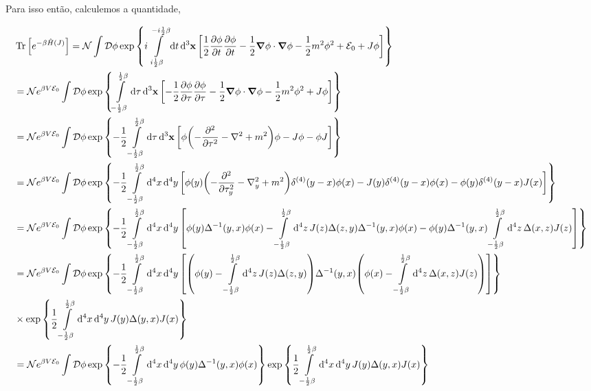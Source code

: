 \documentclass[twoside]{amsart}
\newcommand{\Dd}[1]{\mathcal D #1}
\numberwithin{equation}{section}
\begin{document}
Para isso então, calculemos a quantidade,

\begin{align}
    &\Tr\qty[e^{-\beta\hat H\qty(J)}]=\mathcal N\int\Dd{\phi} \exp\qty{i\int\limits_{i\frac12\beta}^{-i\frac12\beta}\dd{t}\dd[3]{\vb x}\qty[\frac12\pdv{\phi}{t}\pdv{\phi}{t}-\frac12\grad\phi\cdot\grad\phi-\frac12m^2\phi^2+\mathcal E_0+J\phi]}\\
    &=\mathcal Ne^{\beta V\mathcal E_0}\int\Dd{\phi}\exp\qty{\int\limits_{-\frac12\beta}^{\frac12\beta}\dd{\tau}\dd[3]{\vb x}\qty[-\frac12\pdv{\phi}{\tau}\pdv{\phi}{\tau}-\frac12\grad\phi\cdot\grad\phi-\frac12m^2\phi^2+J\phi]}\\
    &=\mathcal Ne^{\beta V\mathcal E_0}\int\Dd{\phi}\exp\qty{-\frac12\int\limits_{-\frac12\beta}^{\frac12\beta}\dd{\tau}\dd[3]{\vb x}\qty[\phi\qty(-\pdv[2]{}{\tau}-\laplacian+m^2)\phi-J\phi-\phi J]}\\
    &=\mathcal Ne^{\beta V\mathcal E_0}\int\Dd{\phi}\exp\qty{-\frac12\int\limits_{-\frac12\beta}^{\frac12\beta}\dd[4]{x}\dd[4]{y}\qty[\phi\qty(y)\qty(-\pdv[2]{}{\tau_y}-\laplacian_y+m^2)\delta^{\qty(4)}\qty(y-x)\phi\qty(x)-J\qty(y)\delta^{\qty(4)}\qty(y-x)\phi\qty(x)-\phi\qty(y)\delta^{\qty(4)}\qty(y-x) J\qty(x)]}\\
    &=\mathcal Ne^{\beta V\mathcal E_0}\int\Dd{\phi}\exp\qty{-\frac12\int\limits_{-\frac12\beta}^{\frac12\beta}\dd[4]{x}\dd[4]{y}\qty[\phi\qty(y)\Delta^{-1}\qty(y,x)\phi\qty(x)-\int\limits_{-\frac12\beta}^{\frac12\beta}\dd[4]{z}J\qty(z)\Delta\qty(z,y)\Delta^{-1}\qty(y,x)\phi\qty(x)-\phi\qty(y)\Delta^{-1}\qty(y,x)\int\limits_{-\frac12\beta}^{\frac12\beta}\dd[4]{z}\Delta\qty(x,z)J\qty(z)]}\\
    &=\mathcal Ne^{\beta V\mathcal E_0}\int\Dd{\phi}\exp\qty{-\frac12\int\limits_{-\frac12\beta}^{\frac12\beta}\dd[4]{x}\dd[4]{y}\qty[\qty(\phi\qty(y)-\int\limits_{-\frac12\beta}^{\frac12\beta}\dd[4]{z}J\qty(z)\Delta\qty(z,y))\Delta^{-1}\qty(y,x)\qty(\phi\qty(x)-\int\limits_{-\frac12\beta}^{\frac12\beta}\dd[4]{z}\Delta\qty(x,z)J\qty(z))]}\\&\times\exp\qty{\frac12\int\limits_{-\frac12\beta}^{\frac12\beta}\dd[4]{x}\dd[4]{y}J\qty(y)\Delta\qty(y,x)J\qty(x)}\nonumber\\
    &=\mathcal Ne^{\beta V\mathcal E_0}\int\Dd{\phi}\exp\qty{-\frac12\int\limits_{-\frac12\beta}^{\frac12\beta}\dd[4]{x}\dd[4]{y}\phi\qty(y)\Delta^{-1}\qty(y,x)\phi\qty(x)}\exp\qty{\frac12\int\limits_{-\frac12\beta}^{\frac12\beta}\dd[4]{x}\dd[4]{y}J\qty(y)\Delta\qty(y,x)J\qty(x)}
\end{align}
\end{document}
